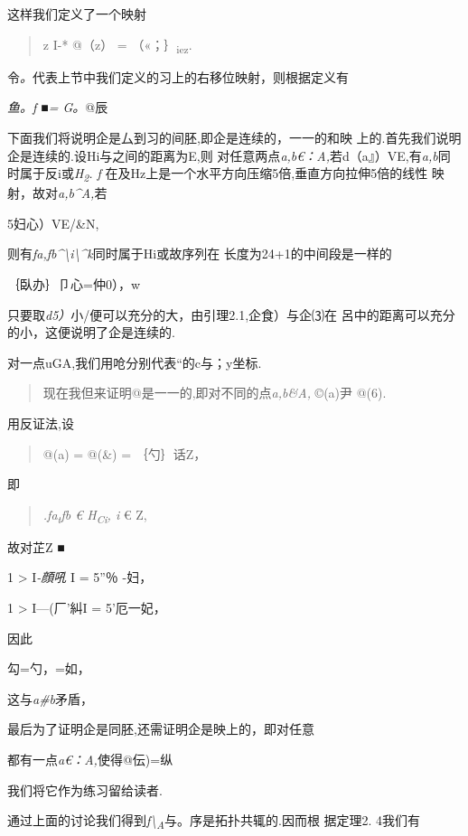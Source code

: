 \documentclass{article}
\begin{document}
这样我们定义了一个映射

\begin{quote}
z I-* @（z） = （«；｝\textsubscript{iez}.
\end{quote}

令\emph{。}代表上节中我们定义的习上的右移位映射，则根据定义有

\emph{鱼。f ■= G。}@辰

下面我们将说明企是厶到习的间胚,即企是连续的，一一的和映
上的.首先我们说明企是连续的.设Hi与之间的距离为E,则
对任意两点\emph{a,b€：A,}若d（a』）VE,有\emph{a,b}同时属于反i或\emph{H\textsubscript{2}.
f} 在及Hz上是一个水平方向压缩5倍,垂直方向拉伸5倍的线性
映射，故对\emph{a,b\^{}A,}若

5妇心）VE/\&N,

则有\emph{fa,fb\^{}\textbackslash{}i\textbackslash{}\^{}k}同时属于Hi或故序列在
长度为24+1的中间段是一样的

｛臥办｝卩心=仲0），w

只要取\emph{d5）}小/便可以充分的大，由引理2.1,企食）与企⑶在
呂中的距离可以充分的小，这便说明了企是连续的.

对一点uGA,我们用呛分别代表``的c与；y坐标.

\begin{quote}
现在我但来证明@是一一的,即对不同的点\emph{a,b\&A,} ©(a)尹 @(6).
\end{quote}

用反证法,设

\begin{quote}
@(a) = @(\&) = ｛勺｝话Z，
\end{quote}

即

\begin{quote}
\emph{.fa\textsubscript{t}fb € H\textsubscript{Ci}, i} € Z,
\end{quote}

故对芷Z ■

1 \textgreater{} I\emph{-顔吼} I = 5''％ -妇，

1 \textgreater{} I---(厂'糾I = 5'厄一妃，

因此

勾=勺，=如，

这与\emph{a\#b}矛盾，

最后为了证明企是同胚,还需证明企是映上的，即对任意

都有一点\emph{a€：A,}使得@伝)=纵

我们将它作为练习留给读者.

通过上面的讨论我们得到\emph{f\textbackslash{}\textsubscript{A}}与。序是拓扑共辄的.因而根
据定理2. 4我们有
\end{document}
